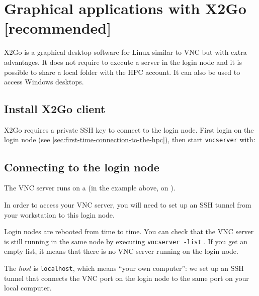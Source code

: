\chapter{Graphical applications with X2Go [recommended]}
\label{ch:x2go}

X2Go is a graphical desktop software for Linux similar to VNC but with extra advantages.
It does not require to execute a server in the login node and it is possible to share a local folder with
the HPC account.
It can also be used to access Windows desktops. 


\section{Install X2Go client}
\label{sec:x2go-client}

X2Go requires a private SSH key to connect to the login node.
First login on the login node (see \autoref{sec:first-time-connection-to-the-hpc}),
then start \lstinline|vncserver| with:



\section{Connecting to the login node}

The VNC server runs on a  (in the example above, on \texttt{\loginhost{}}).

In order to access your VNC server, you will need to set up an SSH tunnel from your workstation
to this login node.

Login nodes are rebooted from time to time. You can check that the VNC server is still
running in the same node by executing \lstinline|vncserver -list| .
If you get an empty list, it means that there is no VNC server running on the login node.


The \emph{host} is \lstinline|localhost|, which means ``your own computer'': we set up an SSH tunnel that connects
the VNC port on the login node to the same port on your local computer.



\ifwindows

